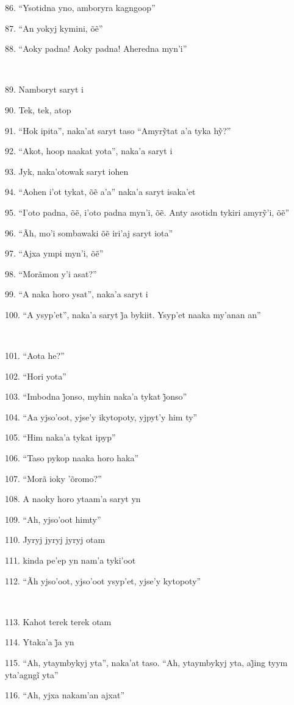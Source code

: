 86. ``Ysotidna yno, amboryra kagngoop''

87. ``An yokyj kymini, õẽ''

88. ``Aoky padna! Aoky padna! Aheredna myn'i''

~

89. Namboryt saryt i

90. Tek, tek, atop

91. ``Hok ipita'', naka’at saryt taso ``Amyrỹtat a’a tyka hỹ?''

92. ``Akot, hoop naakat yota'', naka'a saryt i

93. Jyk, naka'otowak saryt iohen

94. ``Aohen i’ot tykat, õẽ a’a'' naka’a saryt isaka’et

95. ``I’oto padna, õẽ, i’oto padna myn’i, õẽ. Anty asotidn tykiri amyrỹ’i, õẽ''

96. ``Ãh, mo’i sombawaki õẽ iri’aj saryt iota''

97. ``Ajxa ympi myn’i, õẽ''

98. ``Morãmon y'i asat?''

99. ``A naka horo ysat'', naka'a saryt i

100. ``A ysyp’et'', naka’a saryt j̃a bykiit. Ysyp’et naaka my’anan an''

~

101. ``Aota he?''

102. ``Hori yota''

103. ``Imbodna j̃onso, myhin naka’a tykat j̃onso''

104. ``Aa yjso'oot, yjse'y ikytopoty, yjpyt'y him ty''

105. ``Him naka'a tykat ipyp''

106. ``Taso pykop naaka horo haka''

107. ``Morã ioky 'õromo?''

108. A naoky horo ytaam'a saryt yn

109. ``Ah, yjso'oot himty''

110. Jyryj jyryj jyryj otam

111. kinda pe'ep yn nam'a tyki'oot

112. ``Ãh yjso'oot, yjso'oot ysyp'et, yjse'y kytopoty''

~

113. Kahot terek terek otam

114. Ytaka’a j̃a yn

115. ``Ah, ytaymbykyj yta'', naka’at taso. ``Ah, ytaymbykyj yta, aj̃ing tyym yta’agngĩ yta''

116. ``Ah, yjxa nakam'an ajxat''

